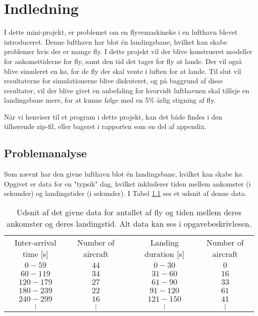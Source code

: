 \chapter{Indledning}
I dette mini-projekt, er problemet om en flyvemaskinekø i en lufthavn blevet introduceret.
Denne lufthavn har blot én landingsbane, hvilket kan skabe problemer hvis der er mange fly.
I dette projekt vil der blive konstrueret modeller for ankomsttiderne for fly, samt den tid det tager for fly at lande.
Der vil også blive simuleret en kø, for de fly der skal vente i luften for at lande.
Til slut vil resultaterne for simulationerne blive diskuteret, og på baggrund af disse resultater, vil der blive givet en anbefaling for hvorvidt lufthavnen skal tilføje en landingsbane mere, for at kunne følge med en 5\% årlig stigning af fly.

Når vi henviser til et program i dette projekt, kan det både findes i den tilhørende zip-fil, eller bagerst i rapporten som en del af appendix.

\section{Problemanalyse}
Som nævnt har den givne lufthavn blot én landingsbane, hvilket kan skabe kø. Opgivet er data for en "typsik" dag, hvilket inkluderer tiden mellem ankomster (i sekunder) og landingstider (i sekunder).
I Tabel \ref{tabel:intro_data} ses et udsnit af denne data.

\begin{table}[h]
	\centering
	\begin{tabular}{ c c c c c}
		\cline{1-2} \cline{4-5}
		Inter-arrival time [s]	&	Number of aircraft	&	\quad	&	Landing duration [s]	&	Number of aircraft	\\
		\cline{1-2} \cline{4-5}
		$0 - 59$								&	$44$								&				&	$0 - 30$							&	$0$									\\
		$60 - 119$							& $34$								&				&	$31 - 60$							&	$16$								\\
		$120 - 179$							& $27$								&				&	$61 - 90$							&	$33$								\\
		$180 - 239$							&	$22$								&				&	$91 - 120$						&	$61$								\\
		$240 - 299$							& $16$								&				&	$121 - 150$						&	$41$								\\
		$\vdots$								& $\vdots$						&				&	$\vdots$							&	$\vdots$						\\
		\cline{1-2} \cline{4-5}
	\end{tabular}
	\caption{Udsnit af det givne data for antallet af fly og tiden mellem deres ankomster og deres landingstid. Alt data kan ses i opgavebeskrivlesen.} \label{tabel:intro_data}
\end{table}

